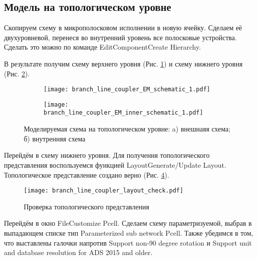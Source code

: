 \subsection{Модель на топологическом уровне}

Скопируем схему в микрополосковом исполнении в новую ячейку. Сделаем её двухуровневой, перенеся во внутренний уровень все полосковые устройства. Сделать это можно по команде Edit\textrightarrow Component\textrightarrow Create Hierarchy.

В результате получим схему верхнего уровня (Рис. \ref{fig:branch_line_coupler_EM_schematic}) и схему нижнего уровня (Рис. \ref{fig:branch_line_coupler_EM_inner_schematic}).

\begin{figure}[!ht]
    \centering
    \begin{subfigure}[b]{0.45\textwidth}
        \centering
        \texttt{[image: branch\_line\_coupler\_EM\_schematic\_1.pdf]}
        \caption{}
        \label{fig:branch_line_coupler_EM_schematic}
    \end{subfigure}
    \hfill
    \begin{subfigure}[b]{0.45\textwidth}
        \centering
        \texttt{[image: branch\_line\_coupler\_EM\_inner\_schematic\_1.pdf]}
        \caption{}
        \label{fig:branch_line_coupler_EM_inner_schematic}
    \end{subfigure}
    \caption{
        Моделируемая схема на топологическом уровне:
        a) внешнаяя схема;
        б) внутренняя схема
    }
    \label{fig:branch_line_coupler_EM_schematics}
\end{figure}

Перейдём в схему нижнего уровня. Для получения топологического представления воспользуемся функцией Layout\textrightarrow Generate/Update Layout.
Топологическое представление создано верно (Рис. \ref{fig:branch_line_coupler_layout_check}).

\begin{figure}[!ht]
    \centering
    \texttt{[image: branch\_line\_coupler\_layout\_check.pdf]}
    \caption{Проверка топологического представления}
    \label{fig:branch_line_coupler_layout_check}
\end{figure}

Перейдём в окно File\textrightarrow Customize Pcell.
Сделаем схему параметризуемой, выбрав в выпадающем списке тип Parameterized sub network Pcell.
Также убедимся в том, что выставлены галочки напротив Support non-90 degree rotation и Support unit and database resolution for ADS 2015 and older.

